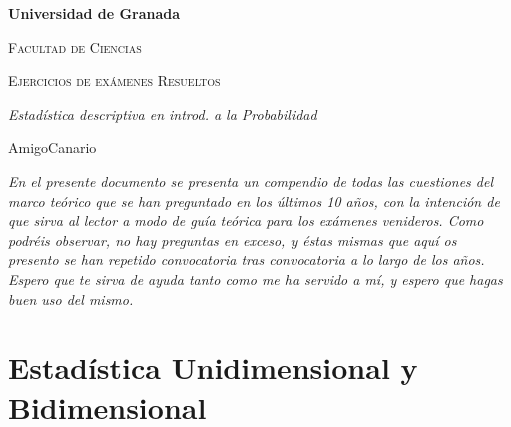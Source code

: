 \documentclass[fleqn]{article}
\author{David García Curbelo}
\begin{document}
        \setcounter{page}{1}
        \pagestyle{plain}



        \begin{titlepage}
                \centering
                {\bfseries\LARGE Universidad de Granada \par}
                \vspace{1cm}
                {\scshape\Large Facultad de Ciencias \par}
                \vspace{5cm}
                {\scshape\Huge Ejercicios de exámenes Resueltos \par}
                \vspace{3cm}
                {\itshape\Large Estadística descriptiva en introd. a la Probabilidad \par}
                \vfill
                {\textit\Large AmigoCanario \par}
        \end{titlepage}


        \textit{En el presente documento se presenta un compendio de todas las cuestiones del marco teórico que se han preguntado en los
        últimos 10 años, con la intención de que sirva al lector a modo de guía teórica para los exámenes venideros. Como podréis 
        observar, no hay preguntas en exceso, y éstas mismas que aquí os presento se han repetido convocatoria tras convocatoria 
        a lo largo de los años. Espero que te sirva de ayuda tanto como me ha servido a mí, y espero que hagas buen uso del mismo.}
        
        \tableofcontents

        \newpage

        \section{Estadística Unidimensional y Bidimensional}
\end{document}

